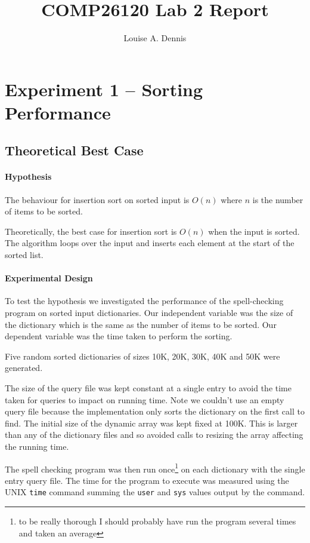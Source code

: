 \documentclass[a4]{article}
\title{COMP26120 Lab 2 Report}
\author{Louise A. Dennis}
\begin{document}
\maketitle

\section{Experiment 1 -- Sorting Performance}
\label{sec:exp_1}

\subsection{Theoretical Best Case}
\label{sec:best_case}

\paragraph{Hypothesis} The behaviour for insertion sort on sorted input is $O(n)$ where $n$ is the number of items to be sorted. 

Theoretically, the best case for insertion sort is $O(n)$ when the input is sorted.  The algorithm loops over the input and inserts each element at the start of the sorted list.  

\paragraph{Experimental Design} 
To test the hypothesis we investigated the performance of the spell-checking program on sorted input dictionaries.  Our independent variable was the size of the dictionary which is the same as the number of items to be sorted.  Our dependent variable was the time taken to perform the sorting.

Five random sorted dictionaries of sizes 10K, 20K, 30K, 40K and 50K were generated.

The size of the query file was kept constant at a single entry to avoid the time taken for queries to impact on running time.  Note we couldn't use an empty query file because the implementation only sorts the dictionary on the first call to find.  The initial size of the dynamic array was kept fixed at 100K.  This is larger than any of the dictionary files and so avoided calls to resizing the array affecting the running time.

The spell checking program was then run once\footnote{to be really thorough I should probably have run the program several times and taken an average} on each dictionary with the single entry query file.  The time for the program to execute was measured using the UNIX \texttt{time} command summing the \texttt{user} and \texttt{sys} values output by the command.  
\end{document}
